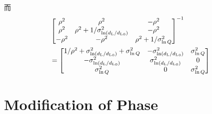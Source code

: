 而
\begin{align}
    &\begin{bmatrix}
        \rho^2&\rho^2&-\rho^2\\
        \rho^2&\rho^2+1/\sigma_{\ln (d_\text{L}/{d_\text{L}}_0)}^2&-\rho^2\\
        -\rho^2&-\rho^2&\rho^2+1/\sigma_{\ln Q}^2
    \end{bmatrix}^{-1}\\
    &=\begin{bmatrix}
        1/\rho^2+\sigma_{\ln (d_\text{L}/{d_\text{L}}_0)}^2+\sigma_{\ln Q}^2&-\sigma_{\ln (d_\text{L}/{d_\text{L}}_0)}^2&\sigma_{\ln Q}^2\\
        -\sigma_{\ln (d_\text{L}/{d_\text{L}}_0)}^2&\sigma_{\ln (d_\text{L}/{d_\text{L}}_0)}^2&0\\
        \sigma_{\ln Q}^2&0&\sigma_{\ln Q}^2
    \end{bmatrix}
\end{align}

\section{Modification of Phase}


